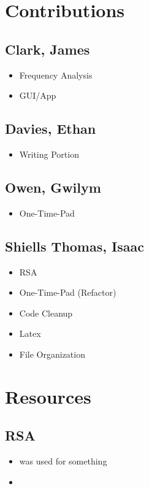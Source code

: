 \documentclass[11pt]{article}
\begin{document}
\begin{multicols}{2}
\begin{spacing}{1.125}
		\section{Contributions}
		\subsection{Clark, James}
		\begin{itemize}
			\item Frequency Analysis
			\item GUI/App
		\end{itemize}
		\subsection{Davies, Ethan}
		\begin{itemize}
			\item Writing Portion
		\end{itemize}
		\subsection{Owen, Gwilym}
		\begin{itemize}
			\item One-Time-Pad
		\end{itemize}
		\subsection{Shiells Thomas, Isaac}
		\begin{itemize}
			\item RSA
			\item One-Time-Pad (Refactor)
			\item Code Cleanup
			\item Latex
			\item File Organization
		\end{itemize}

		\section{Resources}
		\subsection{RSA}
		\begin{itemize}
			\item[\cite{rfc4253}] was used for something
			\item[\cite{101computing_frequency_analysis_2019}]
				\nocite{rfc4253}
		\end{itemize}


		\printbibliography

	\end{spacing}
\end{multicols}
\end{document}
